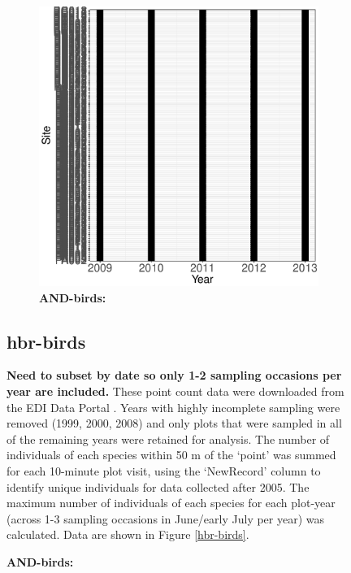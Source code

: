 \documentclass[11pt, oneside]{article}
\begin{document}
\begin{figure}[h!]
\begin{figure}[h!]
\includegraphics[scale = 0.4]{and-birds-wisnoski_spatiotemporal_sampling_effort.pdf}
\caption{{\bf AND-birds:} }
\label{and-birds}
\end{figure}


\subsection {hbr-birds}
{\bf Need to subset by date so only 1-2 sampling occasions per year are included.}
These point count data were downloaded from the EDI Data Portal \citep{hbr-birds}.
Years with highly incomplete sampling were removed (1999, 2000, 2008) and only plots that were sampled in all of the remaining years were retained for analysis.
The number of individuals of each species within 50 m of the `point' was summed for each 10-minute plot visit, using the `NewRecord' column to identify unique individuals for data collected after 2005. 
The maximum number of individuals of each species for each plot-year (across 1-3 sampling occasions in June/early July per year)  was calculated.
Data are shown in Figure \ref{hbr-birds}.



\end{figure}
\end{document}
